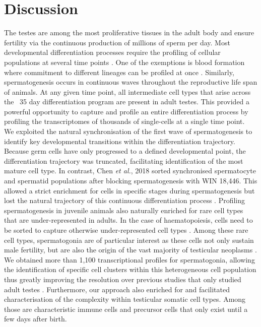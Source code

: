 
\section{Discussion}

The testes are among the most proliferative tissues in the adult body and ensure fertility via the continuous production of millions of sperm per day. Most developmental differentiation processes require the profiling of cellular populations at several time points \citep{Kernfeld2018, Scialdone2016, Wagner2018}. One of the exemptions is blood formation where commitment to different lineages can be profiled at once \citep{Dahlin2018}. Similarly, spermatogenesis occurs in continuous waves throughout the reproductive life span of animals. At any given time point, all intermediate cell types that arise across the ~35 day differentiation program are present in adult testes. This provided a powerful opportunity to capture and profile an entire differentiation process by profiling the transcriptomes of thousands of single-cells at a single time point. \\

We exploited the natural synchronisation of the first wave of spermatogenesis to identify key developmental transitions within the differentiation trajectory. Because germ cells have only progressed to a defined developmental point, the differentiation trajectory was truncated, facilitating identification of the most mature cell type.
In contrast, Chen \emph{et al.}, 2018 sorted synchronised spermatocyte and spermatid populations after blocking spermatogenesis with WIN 18,446. This allowed a strict enrichment for cells in specific stages during spermatogenesis but lost the natural trajectory of this continuous differentiation process \citep{Chen2018}. Profiling spermatogenesis in juvenile animals also naturally enriched for rare cell types that are under-represented in adults. In the case of haematopoiesis, cells need to be sorted to capture otherwise under-represented cell types \citep{Dahlin2018}. Among these rare cell types, spermatogonia are of particular interest as these cells not only sustain male fertility, but are also the origin of the vast majority of testicular neoplasms \citep{Bosl1997}. We obtained more than 1,100 transcriptional profiles for spermatogonia, allowing the identification of specific cell clusters within this heterogeneous cell population thus greatly improving the resolution over previous studies that only studied adult testes \citep{Lukassen2018}. Furthermore, our approach also enriched for and facilitated characterisation of the complexity within testicular somatic cell types. Among those are characteristic immune cells and precursor cells that only exist until a few days after birth.\\

